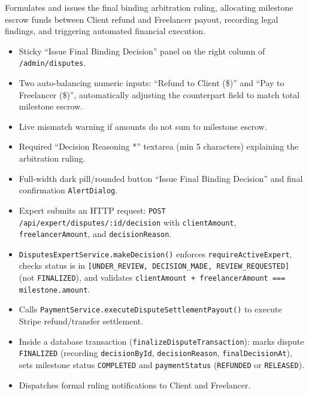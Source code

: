 \noindent Formulates and issues the final binding arbitration ruling, allocating milestone escrow funds between Client refund and Freelancer payout, recording legal findings, and triggering automated financial execution.

\begin{itemize}[leftmargin=1.6em,topsep=3pt,itemsep=2pt,parsep=0pt,label=$\bullet$]
      \item Sticky ``Issue Final Binding Decision'' panel on the right column of \texttt{/admin/disputes}.
      \item Two auto-balancing numeric inputs: ``Refund to Client (\$)'' and ``Pay to Freelancer (\$)'', automatically adjusting the counterpart field to match total milestone escrow.
      \item Live mismatch warning if amounts do not sum to milestone escrow.
      \item Required ``Decision Reasoning *'' textarea (min 5 characters) explaining the arbitration ruling.
      \item Full-width dark pill/rounded button ``Issue Final Binding Decision'' and final confirmation \texttt{AlertDialog}.
\end{itemize}

\begin{itemize}[leftmargin=1.6em,topsep=3pt,itemsep=2pt,parsep=0pt,label=$\bullet$]
      \item Expert submits an HTTP request: \texttt{POST /\allowbreak{}api/\allowbreak{}expert/\allowbreak{}disputes/\allowbreak{}:\allowbreak{}id/\allowbreak{}decision} with \texttt{clientAmount}, \texttt{freelancerAmount}, and \texttt{decisionReason}.
      \item \texttt{DisputesExpertService.makeDecision()} enforces \texttt{requireActiveExpert}, checks status is in \texttt{[UNDER\_REVIEW, DECISION\_MADE, REVIEW\_REQUESTED]} (not \texttt{FINALIZED}), and validates \texttt{clientAmount + freelancerAmount === milestone.amount}.
      \item Calls \texttt{PaymentService.executeDisputeSettlementPayout()} to execute Stripe refund/transfer settlement.
      \item Inside a database transaction (\texttt{finalizeDisputeTransaction}): marks dispute \texttt{FINALIZED} (recording \texttt{decisionById}, \texttt{decisionReason}, \texttt{finalDecisionAt}), sets milestone status \texttt{COMPLETED} and \texttt{paymentStatus} (\texttt{REFUNDED} or \texttt{RELEASED}).
      \item Dispatches formal ruling notifications to Client and Freelancer.
\end{itemize}

